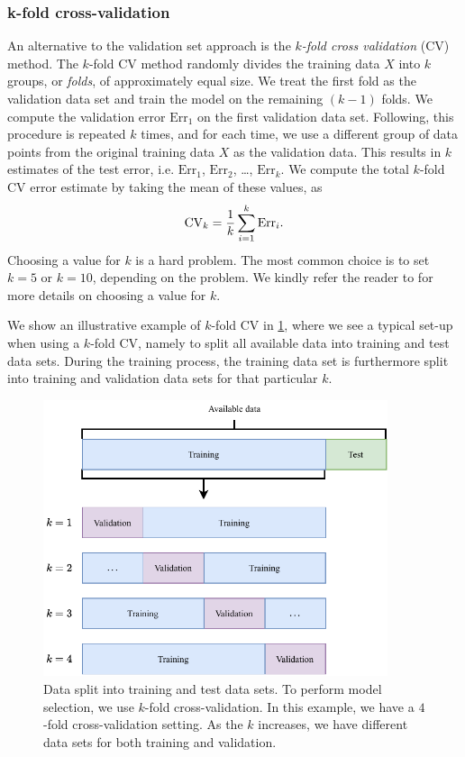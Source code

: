 \subsubsection{k-fold cross-validation}
\label{sec:cross-validation}
An alternative to the validation set approach is the \textit{$k$-fold cross validation} (CV) method. The $k$-fold CV method randomly divides the training data $X$ into $k$ groups, or \textit{folds}, of approximately equal size. We treat the first fold as the validation data set and train the model on the remaining $(k - 1)$ folds. We compute the validation error $\text{Err}_1$ on the first validation data set. Following, this procedure is repeated $k$ times, and for each time, we use a different group of data points from the original training data $X$ as the validation data. This results in $k$ estimates of the test error, i.e. $\text{Err}_1$, $\text{Err}_2$, \ldots, $\text{Err}_k$. We compute the total $k$-fold CV error estimate by taking the mean of these values, as
\begin{align}
    \text{CV}_k = \frac{1}{k} \sum\limits_{i=1}^{k} \text{Err}_i.
\end{align}
Choosing a value for $k$ is a hard problem. The most common choice is to set $k=5$ or $k=10$, depending on the problem. We kindly refer the reader to \cite[Section 5.1.4]{James2013} for more details on choosing a value for $k$.

We show an illustrative example of $k$-fold CV in \cref{fig:k-fold-cv}, where we see a typical set-up when using a $k$-fold CV, namely to split all available data into training and test data sets. During the training process, the training data set is furthermore split into training and validation data sets for that particular $k$.
\begin{figure}[H]
    \centering
    \includegraphics[width=0.9\textwidth]{thesis/figures/k-fold-cv_cropped.pdf}
    \caption{Data split into training and test data sets. To perform model selection, we use $k$-fold cross-validation. In this example, we have a $4$-fold cross-validation setting. As the $k$ increases, we have different data sets for both training and validation.}
    \label{fig:k-fold-cv}
\end{figure}

